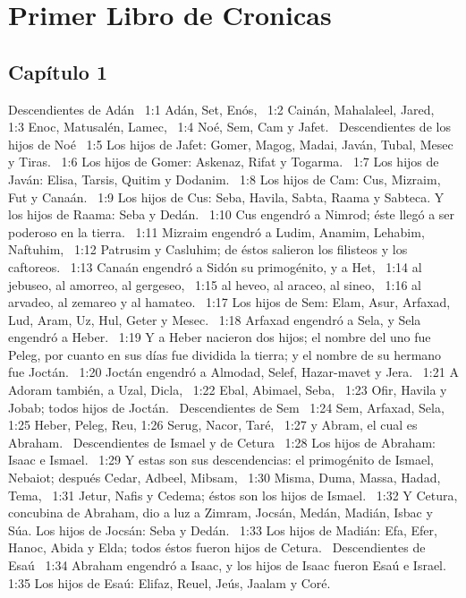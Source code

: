 \chapter{Primer Libro de Cronicas}

\section*{Capítulo 1}

Descendientes de Adán  
1:1 Adán, Set, Enós,  
1:2 Cainán, Mahalaleel, Jared,  
1:3 Enoc, Matusalén, Lamec,  
1:4 Noé, Sem, Cam y Jafet.  
Descendientes de los hijos de Noé  
1:5 Los hijos de Jafet: Gomer, Magog, Madai, Javán, Tubal, Mesec y Tiras.  
1:6 Los hijos de Gomer: Askenaz, Rifat y Togarma.  
1:7 Los hijos de Javán: Elisa, Tarsis, Quitim y Dodanim.  
1:8 Los hijos de Cam: Cus, Mizraim, Fut y Canaán.  
1:9 Los hijos de Cus: Seba, Havila, Sabta, Raama y Sabteca. Y los hijos de Raama: Seba y Dedán.  
1:10 Cus engendró a Nimrod; éste llegó a ser poderoso en la tierra.  
1:11 Mizraim engendró a Ludim, Anamim, Lehabim, Naftuhim,  
1:12 Patrusim y Casluhim; de éstos salieron los filisteos y los caftoreos.  
1:13 Canaán engendró a Sidón su primogénito, y a Het,  
1:14 al jebuseo, al amorreo, al gergeseo,  
1:15 al heveo, al araceo, al sineo,  
1:16 al arvadeo, al zemareo y al hamateo.  
1:17 Los hijos de Sem: Elam, Asur, Arfaxad, Lud, Aram, Uz, Hul, Geter y Mesec.  
1:18 Arfaxad engendró a Sela, y Sela engendró a Heber.  
1:19 Y a Heber nacieron dos hijos; el nombre del uno fue Peleg, por cuanto en sus días fue dividida la tierra; y el nombre de su hermano fue Joctán.  
1:20 Joctán engendró a Almodad, Selef, Hazar-mavet y Jera.  
1:21 A Adoram también, a Uzal, Dicla,  
1:22 Ebal, Abimael, Seba,  
1:23 Ofir, Havila y Jobab; todos hijos de Joctán.  
Descendientes de Sem   
1:24 Sem, Arfaxad, Sela,  
1:25 Heber, Peleg, Reu, 
1:26 Serug, Nacor, Taré,  
1:27 y Abram, el cual es Abraham.  
Descendientes de Ismael y de Cetura   
1:28 Los hijos de Abraham: Isaac e Ismael.  
1:29 Y estas son sus descendencias: el primogénito de Ismael, Nebaiot; después Cedar, Adbeel, Mibsam,  
1:30 Misma, Duma, Massa, Hadad, Tema,  
1:31 Jetur, Nafis y Cedema; éstos son los hijos de Ismael.  
1:32 Y Cetura, concubina de Abraham, dio a luz a Zimram, Jocsán, Medán, Madián, Isbac y Súa. Los hijos de Jocsán: Seba y Dedán.  
1:33 Los hijos de Madián: Efa, Efer, Hanoc, Abida y Elda; todos éstos fueron hijos de Cetura.  
Descendientes de Esaú   
1:34 Abraham engendró a Isaac, y los hijos de Isaac fueron Esaú e Israel.  
1:35 Los hijos de Esaú: Elifaz, Reuel, Jeús, Jaalam y Coré.  
